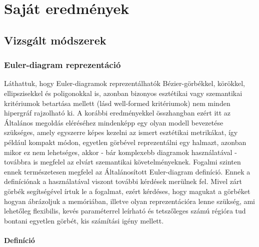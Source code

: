 

\cleardoublepage
\chapter{Saját eredmények}
\section{Vizsgált módszerek}

\subsection{Euler-diagram reprezentáció}

Láthattuk, hogy Euler-diagramok reprezentálhatók Bézier-görbékkel, körökkel, ellipszisekkel és poligonokkal is, azonban bizonyos esztétikai vagy szemantikai kritériumok betartása mellett (lásd well-formed kritériumok) nem minden hipergráf rajzolható ki. A korábbi eredményekkel összhangban ezért itt az 
Általános megoldás eléréséhez mindenképp egy olyan modell bevezetése szükséges, amely egyszerre képes kezelni az ismert esztétikai metrikákat, így például kompakt módon, egyetlen görbével reprezentálni egy halmazt, azonban mikor ez nem lehetséges, akkor - bár komplexebb diagramok használatával - továbbra is megfelel az elvárt szemantikai követelményeknek. Fogalmi szinten ennek természetesen megfelel az Általánosított Euler-diagram definíció. Ennek a definíciónak a használatával viszont további kérdések merülnek fel. Mivel zárt görbék segítségével írtuk le a fogalmat, ezért kérdéses, hogy magukat a görbéket hogyan ábrázoljuk a memóriában, illetve olyan reprezentációra lenne szükség, ami lehetőleg flexibilis, kevés paraméterrel leírható és tetszőleges számú régióra tud bontani egyetlen görbét, kis számítási igény mellett.

\subsubsection{Definíció}

